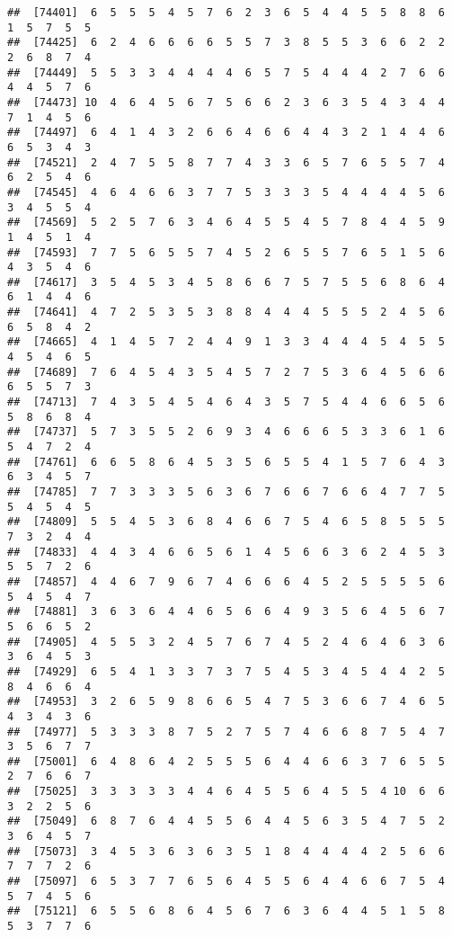 \documentclass[
]{book}
\begin{document}
\begin{verbatim}
##  [74401]  6  5  5  5  4  5  7  6  2  3  6  5  4  4  5  5  8  8  6  1  5  7  5  5
##  [74425]  6  2  4  6  6  6  6  5  5  7  3  8  5  5  3  6  6  2  2  2  6  8  7  4
##  [74449]  5  5  3  3  4  4  4  4  6  5  7  5  4  4  4  2  7  6  6  4  4  5  7  6
##  [74473] 10  4  6  4  5  6  7  5  6  6  2  3  6  3  5  4  3  4  4  7  1  4  5  6
##  [74497]  6  4  1  4  3  2  6  6  4  6  6  4  4  3  2  1  4  4  6  6  5  3  4  3
##  [74521]  2  4  7  5  5  8  7  7  4  3  3  6  5  7  6  5  5  7  4  6  2  5  4  6
##  [74545]  4  6  4  6  6  3  7  7  5  3  3  3  5  4  4  4  4  5  6  3  4  5  5  4
##  [74569]  5  2  5  7  6  3  4  6  4  5  5  4  5  7  8  4  4  5  9  1  4  5  1  4
##  [74593]  7  7  5  6  5  5  7  4  5  2  6  5  5  7  6  5  1  5  6  4  3  5  4  6
##  [74617]  3  5  4  5  3  4  5  8  6  6  7  5  7  5  5  6  8  6  4  6  1  4  4  6
##  [74641]  4  7  2  5  3  5  3  8  8  4  4  4  5  5  5  2  4  5  6  6  5  8  4  2
##  [74665]  4  1  4  5  7  2  4  4  9  1  3  3  4  4  4  5  4  5  5  4  5  4  6  5
##  [74689]  7  6  4  5  4  3  5  4  5  7  2  7  5  3  6  4  5  6  6  6  5  5  7  3
##  [74713]  7  4  3  5  4  5  4  6  4  3  5  7  5  4  4  6  6  5  6  5  8  6  8  4
##  [74737]  5  7  3  5  5  2  6  9  3  4  6  6  6  5  3  3  6  1  6  5  4  7  2  4
##  [74761]  6  6  5  8  6  4  5  3  5  6  5  5  4  1  5  7  6  4  3  6  3  4  5  7
##  [74785]  7  7  3  3  3  5  6  3  6  7  6  6  7  6  6  4  7  7  5  5  4  5  4  5
##  [74809]  5  5  4  5  3  6  8  4  6  6  7  5  4  6  5  8  5  5  5  7  3  2  4  4
##  [74833]  4  4  3  4  6  6  5  6  1  4  5  6  6  3  6  2  4  5  3  5  5  7  2  6
##  [74857]  4  4  6  7  9  6  7  4  6  6  6  4  5  2  5  5  5  5  6  5  4  5  4  7
##  [74881]  3  6  3  6  4  4  6  5  6  6  4  9  3  5  6  4  5  6  7  5  6  6  5  2
##  [74905]  4  5  5  3  2  4  5  7  6  7  4  5  2  4  6  4  6  3  6  3  6  4  5  3
##  [74929]  6  5  4  1  3  3  7  3  7  5  4  5  3  4  5  4  4  2  5  8  4  6  6  4
##  [74953]  3  2  6  5  9  8  6  6  5  4  7  5  3  6  6  7  4  6  5  4  3  4  3  6
##  [74977]  5  3  3  3  8  7  5  2  7  5  7  4  6  6  8  7  5  4  7  3  5  6  7  7
##  [75001]  6  4  8  6  4  2  5  5  5  6  4  4  6  6  3  7  6  5  5  2  7  6  6  7
##  [75025]  3  3  3  3  3  4  4  6  4  5  5  6  4  5  5  4 10  6  6  3  2  2  5  6
##  [75049]  6  8  7  6  4  4  5  5  6  4  4  5  6  3  5  4  7  5  2  3  6  4  5  7
##  [75073]  3  4  5  3  6  3  6  3  5  1  8  4  4  4  4  2  5  6  6  7  7  7  2  6
##  [75097]  6  5  3  7  7  6  5  6  4  5  5  6  4  4  6  6  7  5  4  5  7  4  5  6
##  [75121]  6  5  5  6  8  6  4  5  6  7  6  3  6  4  4  5  1  5  8  5  3  7  7  6

\end{verbatim}
\end{document}
